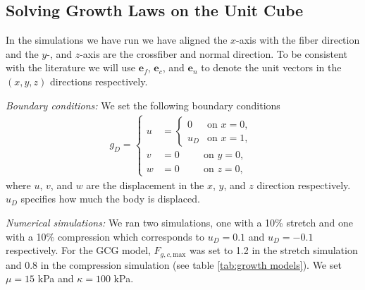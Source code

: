 \subsection{Solving Growth Laws on the Unit Cube}
\label{subsec: simulations}
In the simulations we have run we have aligned the $x$-axis with the fiber direction and the $y$-, and $z$-axis are the crossfiber and normal direction. To be consistent with the literature we will use $\mathbf{e}_f$, $\mathbf{e}_c$, and $\mathbf{e}_n$ to denote the unit vectors in the $(x, y, z)$ directions respectively.  \par
\emph{Boundary conditions:} We set the following boundary conditions
\begin{align*}
    g_D = \begin{cases}
        u &= \begin{cases}
            0 & \text{on } x = 0, \\
            u_D & \text{on } x = 1,
        \end{cases} \\
        v &= 0 \qquad \ \ \text{on } y = 0, \\
        w &= 0 \qquad \ \ \text{on } z = 0,
    \end{cases}
\end{align*}
where $u$, $v$, and $w$ are the displacement in the $x$, $y$, and $z$ direction respectively. $u_D$ specifies how much the body is displaced. 
\par

\emph{Numerical simulations:} We ran two simulations, one with a 10\% stretch and one with a 10\% compression which corresponds to $u_D = 0.1$ and $u_D = -0.1$ respectively. For the GCG model, $F_{g,c,\mathrm{max}}$ was set to 1.2 in the stretch simulation and 0.8 in the compression simulation (see table \ref{tab:growth models}). We set $\mu = 15$ kPa and $\kappa = 100$ kPa.
